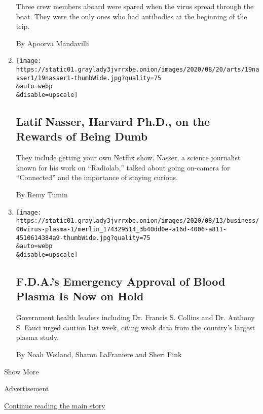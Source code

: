 \begin{enumerate}
  Three crew members aboard were spared when the virus spread through
  the boat. They were the only ones who had antibodies at the beginning
  of the trip.

  By Apoorva Mandavilli
\item
  \href{/2020/08/19/arts/television/connected-latif-nasser-netflix.html}{}

  \texttt{[image: https://static01.graylady3jvrrxbe.onion/images/2020/08/20/arts/19nasser1/19nasser1-thumbWide.jpg?quality=75\\\&auto=webp\\\&disable=upscale]}

  \hypertarget{latif-nasser-harvard-phd-on-the-rewards-of-being-dumb}{%
  \subsection{Latif Nasser, Harvard Ph.D., on the Rewards of Being
  Dumb}\label{latif-nasser-harvard-phd-on-the-rewards-of-being-dumb}}

  They include getting your own Netflix show. Nasser, a science
  journalist known for his work on ``Radiolab,'' talked about going
  on-camera for ``Connected'' and the importance of staying curious.

  By Remy Tumin
\item
  \href{/2020/08/19/us/politics/blood-plasma-covid-19.html}{}

  \texttt{[image: https://static01.graylady3jvrrxbe.onion/images/2020/08/13/business/00virus-plasma-1/merlin\_174329514\_3b40dd0e-a16d-4006-a811-4510614384a9-thumbWide.jpg?quality=75\\\&auto=webp\\\&disable=upscale]}

  \hypertarget{fdas-emergency-approval-of-blood-plasma-is-now-on-hold}{%
  \subsection{F.D.A.'s Emergency Approval of Blood Plasma Is Now on
  Hold}\label{fdas-emergency-approval-of-blood-plasma-is-now-on-hold}}

  Government health leaders including Dr. Francis S. Collins and Dr.
  Anthony S. Fauci urged caution last week, citing weak data from the
  country's largest plasma study.

  By Noah Weiland, Sharon LaFraniere and Sheri Fink
\end{enumerate}

Show More

Advertisement

\protect\hyperlink{after-mid2}{Continue reading the main story}

